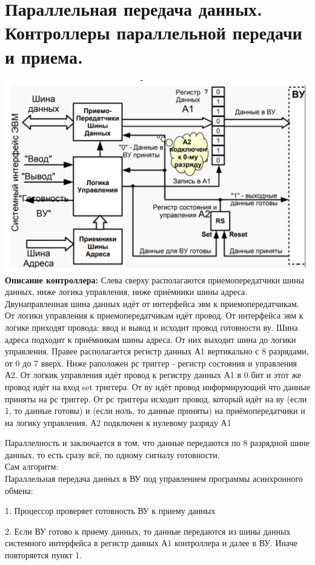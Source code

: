 \documentclass{article}
\begin{document}
\section{Параллельная передача данных. Контроллеры параллельной передачи и приема.}
\includegraphics[width=.8\textwidth]{out1.png}\\
\textbf{Описание контроллера:}
Слева сверху располагаются приемопередатчики шины данных, ниже логика управления, ниже приёмники шины адреса. Двунаправленная шина данных идёт от интерфейса эвм к приемопередатчикам. От логики управления к приемопередатчикам идёт провод. От интерфейса эвм к логике приходят провода: ввод и вывод и исходит провод готовности ву. 
Шина адреса подходит к приёмникам шины адреса. От них выходит шина до логики управления. 
Правее располагается регистр данных А1 вертикально с 8 разрядами, от 0 до 7 вверх. Ниже раположен рс триггер - регистр состояния и управления А2. 
От логкик управления идёт провод к регистру данных А1 в 0 бит и этот же провод идёт на вход set триггера. От ву идёт провод информирующий что данные приняты на рс триггер. От рс триггера исходит провод, который идёт на ву (если 1, то данные готовы) и (если ноль, то данные приняты) на приёмопередатчики и на логику управления.
А2 подключен к нулевому разряду А1



Параллелность и заключается в том, что данные передаются по 8 разрядной шине данных, то есть сразу всё, по одному сигналу готовности.\\

Сам алгоритм: \\
Параллельная передача данных в ВУ под управлением программы асинхронного обмена:

1. Процессор проверяет готовность ВУ к приему данных

2. Если ВУ готово к приему данных, то данные передаются из шины данных системного интерфейса в регистр данных А1 контроллера и далее в
ВУ. Иначе повторяется пункт 1.
\end{document}
